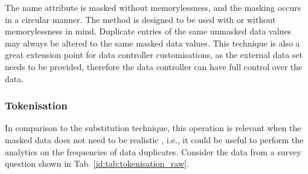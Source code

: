 \documentclass[a4paper,twoside,12pt]{book}
\begin{document}
%
The name attribute is masked without memorylessness, and the masking occurs in a circular manner.
%
The method is designed to be used with or without memorylessness in mind. Duplicate entries of the same unmasked data values may always be altered to the same masked data values. This technique is also a great extension point for data controller customisations, as the external data set needs to be provided, therefore the data controller can have full control over the data.

\subsubsection{Tokenisation}

In comparison to the substitution technique, this operation is relevant when the masked data does not need to be realistic \cite{bib:anonymization_planning}, i.e., it could be useful to perform the analytics on the frequencies of data duplicates.
%
Consider the data from a survey question shown in Tab. \ref{id:tab:tokenisation_raw}.
%
%
%
\end{document}
